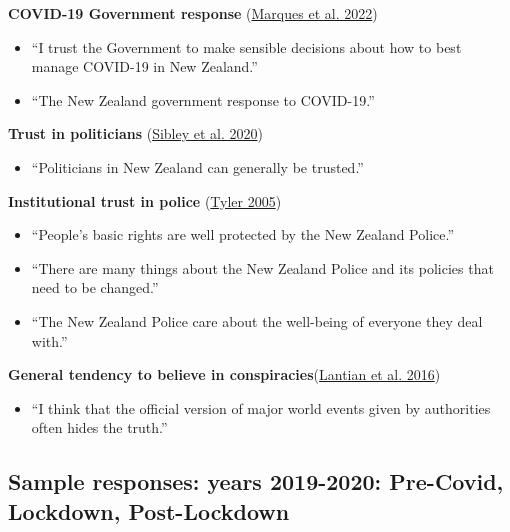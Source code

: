 \documentclass[
  singlecolumn]{report}
\providecommand{\tightlist}{%
  \setlength{\itemsep}{0pt}\setlength{\parskip}{0pt}}\usepackage{longtable,booktabs,array}
\begin{document}
\textbf{COVID-19 Government response}
(\protect\hyperlink{ref-marques2022}{Marques et al. 2022})

\begin{itemize}
\tightlist
\item
  ``I trust the Government to make sensible decisions about how to best
  manage COVID-19 in New Zealand.''
\item
  ``The New Zealand government response to COVID-19.''
\end{itemize}

\textbf{Trust in politicians} (\protect\hyperlink{ref-sibley2020}{Sibley
et al. 2020})

\begin{itemize}
\tightlist
\item
  ``Politicians in New Zealand can generally be trusted.''
\end{itemize}

\textbf{Institutional trust in police}
(\protect\hyperlink{ref-tyler2005}{Tyler 2005})

\begin{itemize}
\tightlist
\item
  ``People's basic rights are well protected by the New Zealand
  Police.''
\item
  ``There are many things about the New Zealand Police and its policies
  that need to be changed.''
\item
  ``The New Zealand Police care about the well-being of everyone they
  deal with.''
\end{itemize}

\textbf{General tendency to believe in
conspiracies}(\protect\hyperlink{ref-lantian2016}{Lantian et al. 2016})

\begin{itemize}
\tightlist
\item
  ``I think that the official version of major world events given by
  authorities often hides the truth.''
\end{itemize}

\hypertarget{sample-responses-years-2019-2020-pre-covid-lockdown-post-lockdown}{%
\subsection{Sample responses: years 2019-2020: Pre-Covid, Lockdown,
Post-Lockdown}\label{sample-responses-years-2019-2020-pre-covid-lockdown-post-lockdown}}
\end{document}
